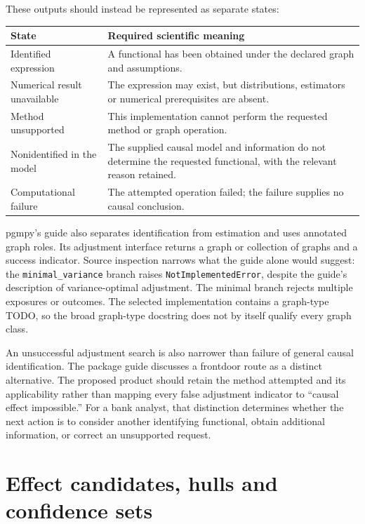 These outputs should instead be represented as separate states:
\begin{center}
\begin{tabular}{p{}p{}}
\toprule
State & Required scientific meaning\\
\midrule
Identified expression & A functional has been obtained under the declared graph and assumptions.\\
Numerical result unavailable & The expression may exist, but distributions, estimators or numerical prerequisites are absent.\\
Method unsupported & This implementation cannot perform the requested method or graph operation.\\
Nonidentified in the model & The supplied causal model and information do not determine the requested functional, with the relevant reason retained.\\
Computational failure & The attempted operation failed; the failure supplies no causal conclusion.\\
\bottomrule
\end{tabular}
\end{center}

pgmpy's guide also separates identification from estimation and uses annotated
graph roles. Its adjustment interface returns a graph or collection of graphs
and a success indicator. Source inspection narrows what the guide alone would
suggest: the \texttt{minimal\_variance} branch raises
\texttt{NotImplementedError}, despite the guide's description of variance-optimal
adjustment. The minimal branch rejects multiple exposures or outcomes. The
selected implementation contains a graph-type TODO, so the broad graph-type
docstring does not by itself qualify every graph class. \cite{v12_sw_pgmpy}

An unsuccessful adjustment search is also narrower than failure of general
causal identification. The package guide discusses a frontdoor route as a
distinct alternative. The proposed product should retain the method attempted
and its applicability rather than mapping every false adjustment indicator to
``causal effect impossible.'' For a bank analyst, that distinction determines
whether the next action is to consider another identifying functional, obtain
additional information, or correct an unsupported request.

\section{Effect candidates, hulls and confidence sets}

